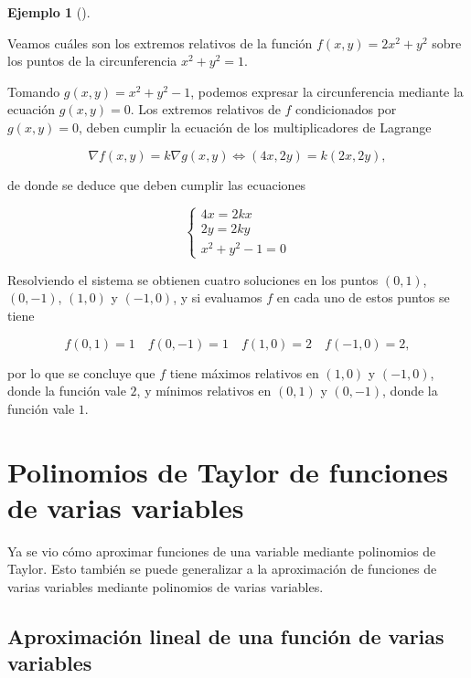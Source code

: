 \documentclass[
  a4paper,
]{scrreport}
\theoremstyle{definition}
\theoremstyle{definition}
\newtheorem{example}{Ejemplo}[chapter]
\theoremstyle{definition}
\theoremstyle{plain}
\theoremstyle{plain}
\theoremstyle{plain}
\theoremstyle{remark}
\begin{document}
\begin{example}[]\protect\hypertarget{exm-multiplicadores-lagrange}{}\label{exm-multiplicadores-lagrange}

Veamos cuáles son los extremos relativos de la función
\(f(x,y)=2x^2+y^2\) sobre los puntos de la circunferencia \(x^2+y^2=1\).

Tomando \(g(x,y)=x^2+y^2-1\), podemos expresar la circunferencia
mediante la ecuación \(g(x,y)=0\). Los extremos relativos de \(f\)
condicionados por \(g(x,y)=0\), deben cumplir la ecuación de los
multiplicadores de Lagrange

\[
\nabla f(x,y) = k \nabla g(x,y) 
\Leftrightarrow (4x, 2y) = k (2x, 2y),
\]

de donde se deduce que deben cumplir las ecuaciones

\[
\begin{cases}
4x = 2kx\\
2y = 2ky\\
x^2+y^2-1=0
\end{cases}
\]

Resolviendo el sistema se obtienen cuatro soluciones en los puntos
\((0,1)\), \((0,-1)\), \((1,0)\) y \((-1,0)\), y si evaluamos \(f\) en
cada uno de estos puntos se tiene

\[
f(0,1) = 1 \quad f(0,-1) = 1 \quad f(1,0)=2 \quad f(-1,0)=2,
\]

por lo que se concluye que \(f\) tiene máximos relativos en \((1,0)\) y
\((-1,0)\), donde la función vale \(2\), y mínimos relativos en
\((0,1)\) y \((0,-1)\), donde la función vale \(1\).

\end{example}

\section{Polinomios de Taylor de funciones de varias
variables}\label{polinomios-de-taylor-de-funciones-de-varias-variables}

Ya se vio cómo aproximar funciones de una variable mediante polinomios
de Taylor. Esto también se puede generalizar a la aproximación de
funciones de varias variables mediante polinomios de varias variables.

\subsection{Aproximación lineal de una función de varias
variables}\label{aproximaciuxf3n-lineal-de-una-funciuxf3n-de-varias-variables}
\end{document}
